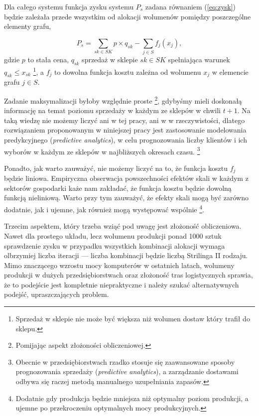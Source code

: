 \documentclass[polish, twoside, 12pt, a4paper]{article}
\theoremstyle{definition}
\theoremstyle{plain}
\theoremstyle{remark}
\begin{document}
Dla całego systemu funkcja zysku systemu $P_s$ zadana równaniem (\ref{eq:zysk}) będzie zależała przede wszystkim od alokacji wolumenów pomiędzy poszczególne elementy grafu,

\begin{equation} \label{eq:zysk}
P_s = \sum\limits_{sk \in SK} p \times q_{sk} - \sum\limits_{j \in S} f_j(x_j),
\end{equation}
 gdzie $p$ to stała cena, $q_{sk}$  sprzedaż w sklepie $sk \in SK$ spełniająca warunek $q_{sk} \le x_{sk}$ \footnote{Sprzedaż w sklepie nie może być większa niż wolumen dostaw który trafił do sklepu.}, a $f_j$ to dowolna funkcja kosztu zależna od wolumenu $x_j$ w elemencie grafu $j \in S$.

Zadanie maksymalizacji byłoby względnie proste \footnote{Pomijając aspekt złożoności obliczeniowej.}, gdybyśmy mieli doskonałą informację na temat poziomu sprzedaży w każdym ze sklepów w chwili $ t + 1 $. Na taką wiedzę nie możemy liczyć ani w tej pracy, ani w w rzeczywistości, dlatego rozwiązaniem proponowanym w niniejszej pracy jest zastosowanie modelowania predykcyjnego (\textit{predictive analytics}), w celu prognozowania liczby klientów i ich wyborów w każdym ze sklepów w najbliższych okresach czasu. \footnote{Obecnie w przedsiębiorstwach rzadko stosuje się zaawansowane sposoby prognozowania sprzedaży (\textit{predictive analytics}), a zarządzanie dostawami odbywa się raczej metodą manualnego uzupełniania zapasów.} 

Ponadto, jak warto zauważyć, nie możemy liczyć na to, że funkcja kosztu $f_j$ będzie liniowa. Empiryczna obserwacja powszechności efektów skali w każdym z sektorów gospodarki każe nam zakładać, że funkcja kosztu będzie dowolną funkcją nieliniową. Warto przy tym zauważyć, że efekty skali mogą być zarówno dodatnie, jak i ujemne, jak również mogą występować wspólnie \footnote{Dodatnie gdy produkcja będzie mniejsza niż optymalny poziom produkcji, a ujemne po przekroczeniu optymalnych mocy produkcyjnych.}.

Trzecim aspektem, który trzeba wziąć pod uwagę jest złożoność obliczeniowa. Nawet dla prostego układu, lecz wolumenu produkcji ponad 1000 sztuk sprawdzenie zysku w przypadku wszystkich kombinacji alokacji wymaga olbrzymiej liczba iteracji --- liczba kombinacji będzie liczbą Strilinga II rodzaju. Mimo znaczącego wzrostu mocy komputerów w ostatnich latach, wolumeny produkcji w dużych przedsiębiorstwach oraz złożoność tras logistycznych sprawia, że to podejście jest kompletnie niepraktyczne i należy szukać alternatywnych podejść, upraszczających problem.
\end{document}
